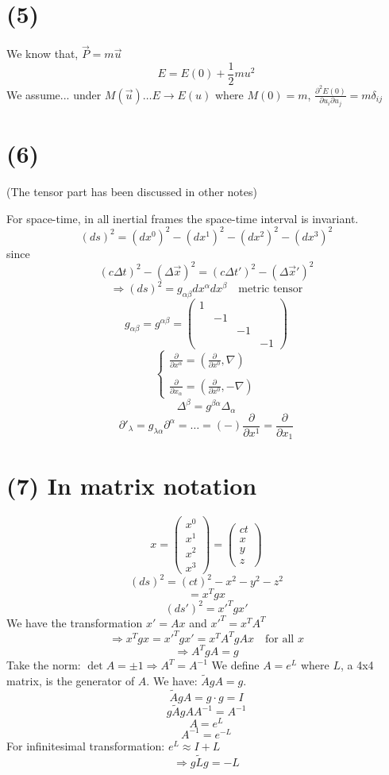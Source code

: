 \documentclass{article}
\begin{document}
	\section*{(5)}
	We know that, $\vec{P} = m\vec{u}$
	\[ E = E(0) + \frac{1}{2} m u^2 \]
	We assume... under $M(\vec{u}) \dots E \to E(u)$
	where $M(0)=m$, $\frac{\partial^2 E(0)}{\partial u_i \partial u_j} = m\delta_{ij}$
	
	\section*{(6)}
	(The tensor part has been discussed in other notes)
	
	For space-time, in all inertial frames the space-time interval is invariant.
	\[ (ds)^2 = (dx^0)^2 - (dx^1)^2 - (dx^2)^2 - (dx^3)^2 \]
	since
	\[ (c\Delta t)^2 - (\Delta \vec{x})^2 = (c\Delta t')^2 - (\Delta \vec{x}')^2 \]
	\[ \Rightarrow (ds)^2 = g_{\alpha\beta} dx^\alpha dx^\beta \quad \text{metric tensor} \]
	\[ g_{\alpha\beta} = g^{\alpha\beta} =
	\begin{pmatrix}
		1 & & & \\
		& -1 & & \\
		& & -1 & \\
		& & & -1
	\end{pmatrix}
	\]
	\[
	\begin{cases}
		\frac{\partial}{\partial x^\alpha} = (\frac{\partial}{\partial x^0}, \nabla) \\
		\\
		\frac{\partial}{\partial x_\alpha} = (\frac{\partial}{\partial x^0}, -\nabla)
	\end{cases}
	\]
	\[ \Delta^\beta = g^{\beta\alpha} \Delta_\alpha \]
	\[ \partial'_\lambda = g_{\lambda\alpha} \partial^\alpha = \dots = (-)\frac{\partial}{\partial x^1} = \frac{\partial}{\partial x_1} \]
	
	\section*{(7) In matrix notation}
	\[ x =
	\begin{pmatrix} x^0 \\ x^1 \\ x^2 \\ x^3 \end{pmatrix}
	=
	\begin{pmatrix} ct \\ x \\ y \\ z \end{pmatrix}
	\]
	\[ (ds)^2 = (ct)^2 - x^2 - y^2 - z^2 \]
	\[ = x^T g x \]
	\[ (ds')^2 = x'^T g x' \]
	We have the transformation $x' = Ax$ and $x'^T = x^T A^T$
	\[ \Rightarrow x^T g x = x'^T g x' = x^T A^T g A x \quad \text{for all } x \]
	\[ \Rightarrow A^T g A = g \]
	Take the norm: $\det A = \pm 1 \Rightarrow A^T = A^{-1}$
	We define $A = e^L$ where $L$, a 4x4 matrix, is the generator of $A$.
	We have: $\tilde{A}gA = g$.
	\[ \tilde{A}gA = g \cdot g = I \]
	\[ g\tilde{A}g A A^{-1} = A^{-1} \]
	\[ A = e^L \]
	\[ A^{-1} = e^{-L} \]
	For infinitesimal transformation: $e^L \approx I + L$
	\[ \Rightarrow g \tilde{L} g = -L \]
	
\end{document}
